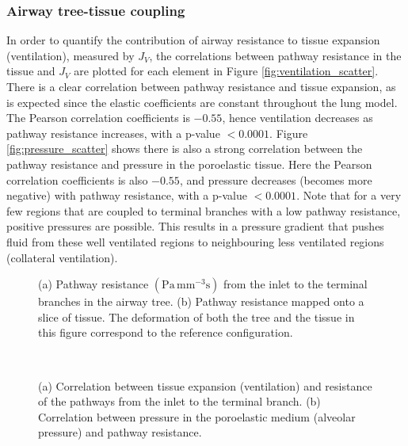 \subsubsection{Airway tree-tissue coupling}
In order to quantify the contribution of airway resistance to tissue expansion (ventilation), measured by $J_{V}$, the correlations between pathway resistance in the tissue and $J_V$ are plotted for each element in Figure \ref{fig:ventilation_scatter}. There is a clear correlation between pathway resistance and tissue expansion, as is expected since the elastic coefficients are constant throughout the lung model. The Pearson correlation coefficients is $-0.55$, hence ventilation decreases as pathway resistance increases, with a p-value $<0.0001$. Figure \ref{fig:pressure_scatter} shows there is also a strong correlation between the pathway resistance and pressure in the poroelastic tissue. Here the Pearson correlation coefficients is also $-0.55$, and pressure decreases (becomes more negative) with pathway resistance, with a p-value $<0.0001$. Note that for a very few regions that are coupled to terminal branches with a low pathway resistance, positive pressures are possible. This results in a pressure gradient that pushes fluid from these well ventilated regions to neighbouring less ventilated regions (collateral ventilation).
%
\begin{figure}[h]
  \centering
{}
  \label{fig:acinar_units}
\caption{(a) Pathway resistance $(\mbox{Pa}\,\mbox{mm}^{-3}\mbox{s})$ from the inlet to the terminal branches in the airway tree. (b) Pathway resistance mapped onto a slice of tissue. The deformation of both the tree and the tissue in this figure correspond to the reference configuration. }
\end{figure}
%
\begin{figure}[h]
  \centering\
  \subfloat[]{\label{fig:pressure_scatter}\texttt{[image: figures/pressure\_res\_scatter-crop.pdf]}}
\caption{(a) Correlation between tissue expansion (ventilation) and resistance of the pathways from the inlet to the terminal branch. (b) Correlation between pressure in the poroelastic medium (alveolar pressure) and pathway resistance.}
\label{fig:scatter}
\end{figure}
